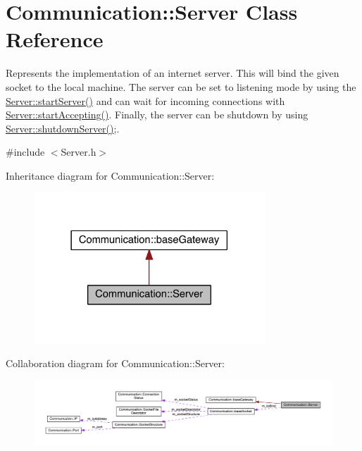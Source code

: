\hypertarget{class_communication_1_1_server}{}\section{Communication\+:\+:Server Class Reference}
\label{class_communication_1_1_server}


Represents the implementation of an internet server. This will bind the given socket to the local machine. The server can be set to listening mode by using the \hyperlink{class_communication_1_1_server_a30f8961c165145504a3c29410c0b643c}{Server\+::start\+Server()} and can wait for incoming connections with \hyperlink{class_communication_1_1_server_aa005d6dfbb2f3d09bb6f5c31c7f61563}{Server\+::start\+Accepting()}. Finally, the server can be shutdown by using \hyperlink{class_communication_1_1_server_a9d80054a0eb0a8f4935a766344f9e076}{Server\+::shutdown\+Server()};.  




{\ttfamily \#include $<$Server.\+h$>$}



Inheritance diagram for Communication\+:\+:Server\+:\nopagebreak
\begin{figure}[H]
\begin{center}
\leavevmode
\includegraphics[width=246pt]{class_communication_1_1_server__inherit__graph}
\end{center}
\end{figure}


Collaboration diagram for Communication\+:\+:Server\+:\nopagebreak
\begin{figure}[H]
\begin{center}
\leavevmode
\includegraphics[width=350pt]{class_communication_1_1_server__coll__graph}
\end{center}
\end{figure}
